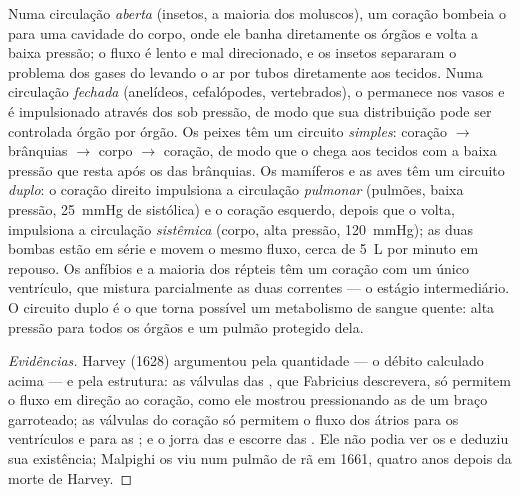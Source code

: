 \begin{definition}\label{def:b2:blood-circulation:circuits}
Numa circulação \emph{aberta} (insetos, a maioria dos moluscos), um
coração bombeia o  para uma cavidade do corpo, onde ele banha
diretamente os órgãos e volta a baixa pressão; o fluxo é lento e mal
direcionado, e os insetos separaram o problema dos gases do 
levando o ar por tubos diretamente aos tecidos. Numa circulação
\emph{fechada} (anelídeos, cefalópodes, vertebrados), o 
permanece nos vasos e é impulsionado através dos  sob
pressão, de modo que sua distribuição pode ser controlada órgão por
órgão. Os peixes têm um circuito \emph{simples}: coração $\to$
brânquias $\to$ corpo $\to$ coração, de modo que o  chega aos
tecidos com a baixa pressão que resta após os  das brânquias.
Os mamíferos e as aves têm um circuito \emph{duplo}: o coração direito
impulsiona a circulação \emph{pulmonar} (pulmões, baixa pressão,
\qty{25}{mmHg} de sistólica) e o coração esquerdo, depois que o 
volta, impulsiona a circulação \emph{sistêmica} (corpo, alta pressão,
\qty{120}{mmHg}); as duas bombas estão em série e movem o mesmo fluxo,
cerca de \qty{5}{L} por minuto em repouso. Os anfíbios e a maioria dos
répteis têm um coração com um único ventrículo, que mistura
parcialmente as duas correntes --- o estágio intermediário. O circuito
duplo é o que torna possível um metabolismo de sangue quente: alta
pressão para todos os órgãos e um pulmão protegido dela.
\end{definition}
\begin{proof}[Evidências]
Harvey (1628) argumentou pela quantidade --- o débito calculado acima ---
e pela estrutura: as válvulas das , que Fabricius descrevera, só
permitem o fluxo em direção ao coração, como ele mostrou pressionando
as  de um braço garroteado; as válvulas do coração só permitem o
fluxo dos átrios para os ventrículos e para as ; e o 
jorra das  e escorre das . Ele não podia ver os 
e deduziu sua existência; Malpighi os viu num pulmão de rã em 1661,
quatro anos depois da morte de Harvey.
\end{proof}

